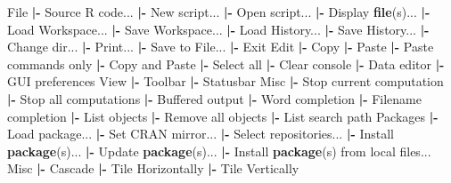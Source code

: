 \documentclass[12pt,]{krantz}
\newenvironment{Shaded}{\begin{snugshade}}{\end{snugshade}}
\newcommand{\KeywordTok}[1]{\textcolor[rgb]{0.13,0.29,0.53}{\textbf{#1}}}
\newcommand{\NormalTok}[1]{#1}
\newcommand{\OperatorTok}[1]{\textcolor[rgb]{0.81,0.36,0.00}{\textbf{#1}}}
\newcommand{\StringTok}[1]{\textcolor[rgb]{0.31,0.60,0.02}{#1}}
\begin{document}
\begin{Shaded}
\begin{Highlighting}[]
\NormalTok{File}
  \OperatorTok{|-}\StringTok{ }\NormalTok{Source R code...}
  \OperatorTok{|-}\StringTok{ }\NormalTok{New script...}
  \OperatorTok{|-}\StringTok{ }\NormalTok{Open script...}
  \OperatorTok{|-}\StringTok{ }\NormalTok{Display }\KeywordTok{file}\NormalTok{(s)...}
  \OperatorTok{|-}\StringTok{ }\NormalTok{Load Workspace...}
  \OperatorTok{|-}\StringTok{ }\NormalTok{Save Workspace...}
  \OperatorTok{|-}\StringTok{ }\NormalTok{Load History...}
  \OperatorTok{|-}\StringTok{ }\NormalTok{Save History...}
  \OperatorTok{|-}\StringTok{ }\NormalTok{Change dir...}
  \OperatorTok{|-}\StringTok{ }\NormalTok{Print...}
  \OperatorTok{|-}\StringTok{ }\NormalTok{Save to File...}
  \OperatorTok{|-}\StringTok{ }\NormalTok{Exit}
\NormalTok{Edit}
  \OperatorTok{|-}\StringTok{ }\NormalTok{Copy}
  \OperatorTok{|-}\StringTok{ }\NormalTok{Paste}
  \OperatorTok{|-}\StringTok{ }\NormalTok{Paste commands only}
  \OperatorTok{|-}\StringTok{ }\NormalTok{Copy and Paste}
  \OperatorTok{|-}\StringTok{ }\NormalTok{Select all}
  \OperatorTok{|-}\StringTok{ }\NormalTok{Clear console}
  \OperatorTok{|-}\StringTok{ }\NormalTok{Data editor}
  \OperatorTok{|-}\StringTok{ }\NormalTok{GUI preferences}
\NormalTok{View}
  \OperatorTok{|-}\StringTok{ }\NormalTok{Toolbar}
  \OperatorTok{|-}\StringTok{ }\NormalTok{Statusbar}
\NormalTok{Misc}
  \OperatorTok{|-}\StringTok{ }\NormalTok{Stop current computation}
  \OperatorTok{|-}\StringTok{ }\NormalTok{Stop all computations}
  \OperatorTok{|-}\StringTok{ }\NormalTok{Buffered output}
  \OperatorTok{|-}\StringTok{ }\NormalTok{Word completion}
  \OperatorTok{|-}\StringTok{ }\NormalTok{Filename completion}
  \OperatorTok{|-}\StringTok{ }\NormalTok{List objects}
  \OperatorTok{|-}\StringTok{ }\NormalTok{Remove all objects}
  \OperatorTok{|-}\StringTok{ }\NormalTok{List search path}
\NormalTok{Packages}
  \OperatorTok{|-}\StringTok{ }\NormalTok{Load package...}
  \OperatorTok{|-}\StringTok{ }\NormalTok{Set CRAN mirror...}
  \OperatorTok{|-}\StringTok{ }\NormalTok{Select repositories...}
  \OperatorTok{|-}\StringTok{ }\NormalTok{Install }\KeywordTok{package}\NormalTok{(s)...}
  \OperatorTok{|-}\StringTok{ }\NormalTok{Update }\KeywordTok{package}\NormalTok{(s)...}
  \OperatorTok{|-}\StringTok{ }\NormalTok{Install }\KeywordTok{package}\NormalTok{(s) from local files...}
\NormalTok{Misc}
  \OperatorTok{|-}\StringTok{ }\NormalTok{Cascade}
  \OperatorTok{|-}\StringTok{ }\NormalTok{Tile Horizontally}
  \OperatorTok{|-}\StringTok{ }\NormalTok{Tile Vertically}

\end{Highlighting}
\end{Shaded}
\end{document}

